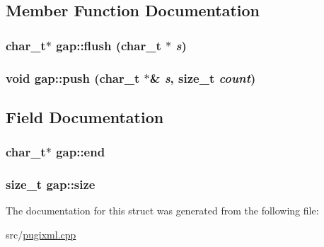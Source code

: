 \subsection{Member Function Documentation}
\hypertarget{structgap_a176c58ee8d57c41b91ae9f00d5e8cab5}{
\subsubsection[{flush}]{\setlength{\rightskip}{0pt plus 5cm}char\_\-t$\ast$ gap::flush (char\_\-t $\ast$ {\em s})}}
\label{structgap_a176c58ee8d57c41b91ae9f00d5e8cab5}
\hypertarget{structgap_a9c0d0b12bc778c8439c8aec7747ab2b0}{
\subsubsection[{push}]{\setlength{\rightskip}{0pt plus 5cm}void gap::push (char\_\-t $\ast$\& {\em s}, \/  size\_\-t {\em count})}}
\label{structgap_a9c0d0b12bc778c8439c8aec7747ab2b0}


\subsection{Field Documentation}
\hypertarget{structgap_a1fafd4d9909a3413f723f24e46dfde0e}{
\subsubsection[{end}]{\setlength{\rightskip}{0pt plus 5cm}char\_\-t$\ast$ {\bf gap::end}}}
\label{structgap_a1fafd4d9909a3413f723f24e46dfde0e}
\hypertarget{structgap_ad5bb3597ade78d89bbe0e300748ad508}{
\subsubsection[{size}]{\setlength{\rightskip}{0pt plus 5cm}size\_\-t {\bf gap::size}}}
\label{structgap_ad5bb3597ade78d89bbe0e300748ad508}


The documentation for this struct was generated from the following file:\begin{DoxyCompactItemize}
\item 
src/\hyperlink{pugixml_8cpp}{pugixml.cpp}\end{DoxyCompactItemize}
